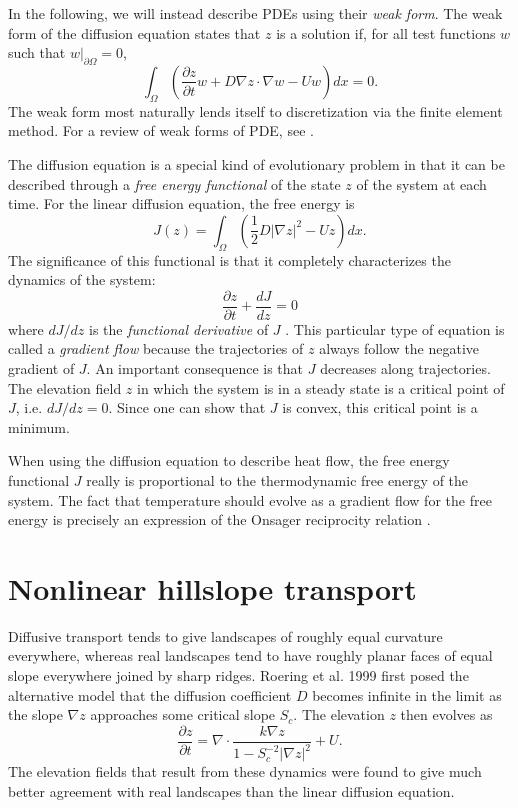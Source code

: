 \documentclass{article}
\theoremstyle{definition}
\theoremstyle{plain}
\begin{document}
In the following, we will instead describe PDEs using their \emph{weak form}.
The weak form of the diffusion equation states that $z$ is a solution if, for all test functions $w$ such that $w|_{\partial\Omega} = 0$,
\begin{equation}
    \int_\Omega\left(\frac{\partial z}{\partial t}w + D\nabla z\cdot\nabla w - Uw\right)dx = 0.
\end{equation}
The weak form most naturally lends itself to discretization via the finite element method.
For a review of weak forms of PDE, see \citet{folland1995introduction}.

The diffusion equation is a special kind of evolutionary problem in that it can be described through a \emph{free energy functional} of the state $z$ of the system at each time.
For the linear diffusion equation, the free energy is
\begin{equation}
    J(z) = \int_\Omega\left(\frac{1}{2}D|\nabla z|^2 - Uz\right)dx.
\end{equation}
The significance of this functional is that it completely characterizes the dynamics of the system:
\begin{equation}
    \frac{\partial z}{\partial t} + \frac{dJ}{dz} = 0
\end{equation}
where $dJ/dz$ is the \emph{functional derivative} of $J$ \citep{weinstock1974calculus}.
This particular type of equation is called a \emph{gradient flow} because the trajectories of $z$ always follow the negative gradient of $J$.
An important consequence is that $J$ decreases along trajectories.
The elevation field $z$ in which the system is in a steady state is a critical point of $J$, i.e. $dJ/dz = 0$.
Since one can show that $J$ is convex, this critical point is a minimum.

When using the diffusion equation to describe heat flow, the free energy functional $J$ really is proportional to the thermodynamic free energy of the system.
The fact that temperature should evolve as a gradient flow for the free energy is precisely an expression of the Onsager reciprocity relation \citep{onsager1931reciprocal}.


\section{Nonlinear hillslope transport}

Diffusive transport tends to give landscapes of roughly equal curvature everywhere, whereas real landscapes tend to have roughly planar faces of equal slope everywhere joined by sharp ridges.
Roering et al. 1999 first posed the alternative model that the diffusion coefficient $D$ becomes infinite in the limit as the slope $\nabla z$ approaches some critical slope $S_c$.
The elevation $z$ then evolves as
\begin{equation}
    \frac{\partial z}{\partial t} = \nabla\cdot\frac{k\nabla z}{1 - S_c^{-2}|\nabla z|^2} + U.
\label{hillslope-eqn}\end{equation}
The elevation fields that result from these dynamics were found to give much better agreement with real landscapes than the linear diffusion equation.
\end{document}
